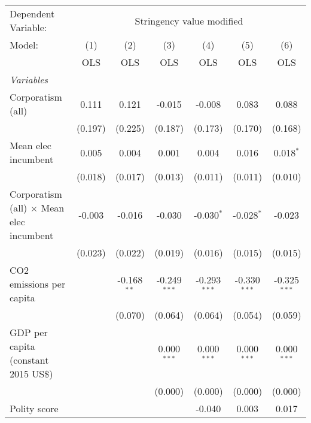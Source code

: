 
\begingroup
\centering
\begin{tabular}{lcccccc}
   \toprule
   Dependent Variable: & \multicolumn{6}{c}{Stringency value modified}\\
   Model:                                          & (1)     & (2)           & (3)            & (4)            & (5)            & (6)\\  
                                                   &  OLS    & OLS           & OLS            & OLS            & OLS            & OLS\\  
   \midrule
   \emph{Variables}\\
   Corporatism (all)                               & 0.111   & 0.121         & -0.015         & -0.008         & 0.083          & 0.088\\   
                                                   & (0.197) & (0.225)       & (0.187)        & (0.173)        & (0.170)        & (0.168)\\   
   Mean elec incumbent                             & 0.005   & 0.004         & 0.001          & 0.004          & 0.016          & 0.018$^{*}$\\   
                                                   & (0.018) & (0.017)       & (0.013)        & (0.011)        & (0.011)        & (0.010)\\   
   Corporatism (all) $\times$ Mean elec incumbent  & -0.003  & -0.016        & -0.030         & -0.030$^{*}$   & -0.028$^{*}$   & -0.023\\   
                                                   & (0.023) & (0.022)       & (0.019)        & (0.016)        & (0.015)        & (0.015)\\   
   CO2 emissions per capita                        &         & -0.168$^{**}$ & -0.249$^{***}$ & -0.293$^{***}$ & -0.330$^{***}$ & -0.325$^{***}$\\   
                                                   &         & (0.070)       & (0.064)        & (0.064)        & (0.054)        & (0.059)\\   
   GDP per capita (constant 2015 US\$)             &         &               & 0.000$^{***}$  & 0.000$^{***}$  & 0.000$^{***}$  & 0.000$^{***}$\\   
                                                   &         &               & (0.000)        & (0.000)        & (0.000)        & (0.000)\\   
   Polity score                                    &         &               &                & -0.040         & 0.003          & 0.017\\   

\end{tabular}
